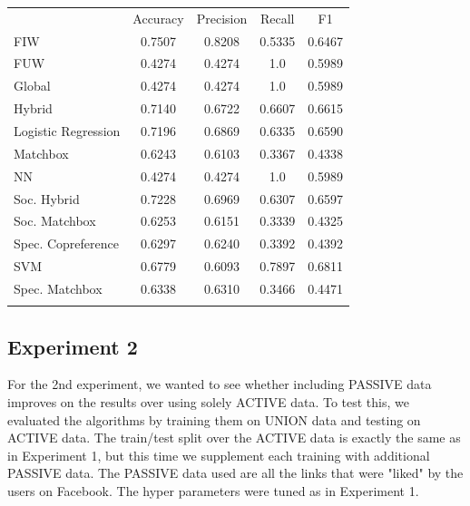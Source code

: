 \begin{table}
\begin{tabular}{ l  c  c  c  c }
\hline\noalign{\smallskip}
 & Accuracy & Precision & Recall & F1 \\
  \noalign{\smallskip}\hline\noalign{\smallskip}
FIW & 0.7507 &  0.8208 & 0.5335 &  0.6467  \\
FUW & 0.4274 & 0.4274  & 1.0  & 0.5989 \\
Global &  0.4274 & 0.4274  & 1.0  & 0.5989 \\
Hybrid &  0.7140 & 0.6722 & 0.6607 & 0.6615  \\
Logistic Regression &  0.7196  & 0.6869 & 0.6335  & 0.6590 \\
Matchbox & 0.6243 & 0.6103 & 0.3367 & 0.4338 \\
NN & 0.4274 & 0.4274  & 1.0  & 0.5989 \\
Soc. Hybrid & 0.7228 & 0.6969  & 0.6307  & 0.6597  \\
Soc. Matchbox & 0.6253 & 0.6151  & 0.3339 & 0.4325  \\
Spec. Copreference & 0.6297  & 0.6240 & 0.3392  & 0.4392 \\
SVM & 0.6779 & 0.6093 & 0.7897  & 0.6811 \\
Spec. Matchbox & 0.6338  & 0.6310 & 0.3466 & 0.4471  \\
\noalign{\smallskip}\hline
\end{tabular}
\end{table}




\subsection{Experiment 2}
\label{sec:2}

For the 2nd experiment, we wanted to see whether including PASSIVE data improves on the results over using solely ACTIVE data.
To test this, we evaluated the algorithms by training them on UNION data and testing on ACTIVE data. The train/test split over the ACTIVE data is exactly
the same as in Experiment 1, but this time we supplement each training with additional PASSIVE data. The PASSIVE data used are all the 
links that were "liked" by the users on Facebook. The hyper parameters were tuned as in Experiment 1.


